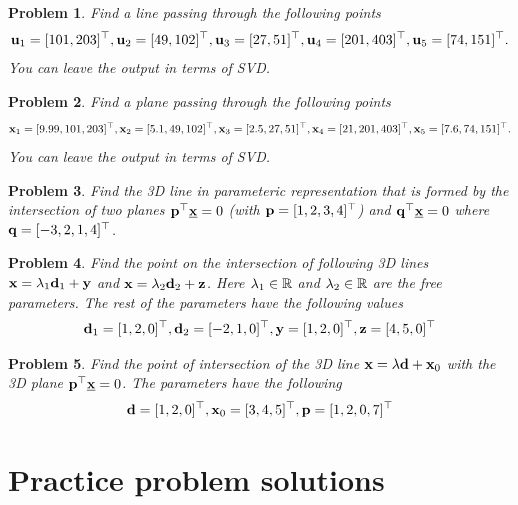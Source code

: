 \documentclass{article}
\newtheorem{prob}{Problem}
\begin{document}
\begin{prob}
  Find a line passing through the following points 
  \begin{align*}
    \mathbf{u}_1 = [101, 203]^\top,
    \mathbf{u}_2 = [49, 102]^\top,
    \mathbf{u}_3 = [27, 51]^\top,
    \mathbf{u}_4 = [201, 403]^\top,
    \mathbf{u}_5 = [74, 151]^\top.
    \end{align*}
    You can leave the output in terms of SVD.
\end{prob}

\begin{prob}
  Find a plane passing through the following points 
  \begin{align*}
    \mathbf{x}_1 = [9.99, 101, 203]^\top,
    \mathbf{x}_2 = [5.1, 49, 102]^\top,
    \mathbf{x}_3 = [2.5, 27, 51]^\top,
    \mathbf{x}_4 = [21, 201, 403]^\top,
    \mathbf{x}_5 = [7.6, 74, 151]^\top.
  \end{align*}
  You can leave the output in terms of SVD.
\end{prob}

\begin{prob}
  Find the 3D line in parameteric representation that is formed by the intersection of two planes $\mathbf{p}^\top \underline{\mathbf{x}} = 0$ (with $\mathbf{p} = [1, 2,
  3, 4]^\top$)  and $\mathbf{q}^\top \underline{\mathbf{x}} = 0$ where $\mathbf{q} = [-3, 2, 1, 4]^\top$.
\end{prob}

\begin{prob}
  Find the point on the intersection of following 3D lines $\mathbf{x} = \lambda_1
  \mathbf{d}_1 +  \mathbf{y}$ and $\mathbf{x} = \lambda_2 \mathbf{d}_2 + \mathbf{z}$. Here $\lambda_1\in \mathbb{R}$ and
  $\lambda_2 \in \mathbb{R}$ are the free parameters. The rest of the parameters have
  the following values
  \begin{align*}
    \mathbf{d}_1 = [1, 2, 0]^\top,
    \mathbf{d}_2 = [-2, 1, 0]^\top,
    \mathbf{y} = [1, 2, 0]^\top,
    \mathbf{z} = [4, 5, 0]^\top
    \end{align*}
\end{prob}

\begin{prob}
  Find the point of intersection of the 3D line $\mathbf{x} = \lambda \mathbf{d} + \mathbf{x}_0$ with
  the 3D plane $\mathbf{p}^\top \underline{\mathbf{x}} = 0$. The parameters have the
  following
  \begin{align*}
    \mathbf{d} = [1, 2, 0]^\top, \mathbf{x}_0 = [3, 4, 5]^\top, \mathbf{p} = [1, 2, 0, 7]^\top
  \end{align*}
\end{prob}

\newpage
\section*{Practice problem solutions}
\end{document}
